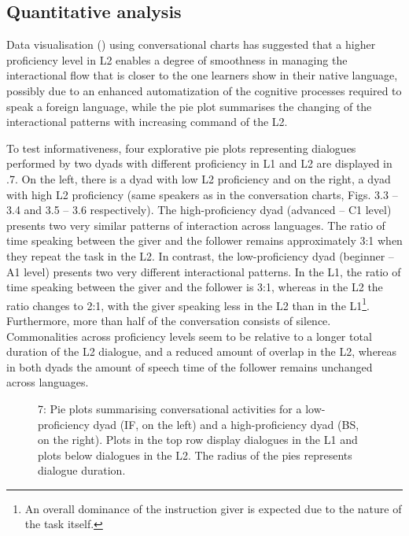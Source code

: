 \subsection{Quantitative analysis}
\hypertarget{Toc191305935}{}
Data visualisation () using conversational charts has suggested that a higher proficiency level in L2 enables a degree of smoothness in managing the interactional flow that is closer to the one learners show in their native language, possibly due to an enhanced automatization of the cognitive processes required to speak a foreign language, while the pie plot summarises the changing of the interactional patterns with increasing command of the L2. 

To test informativeness, four explorative pie plots representing dialogues performed by two dyads with different proficiency in L1 and L2 are displayed in .7. On the left, there is a dyad with low L2 proficiency and on the right, a dyad with high L2 proficiency (same speakers as in the conversation charts, Figs. 3.3 – 3.4 and 3.5 – 3.6 respectively). The high-proficiency dyad (advanced – C1 level) presents two very similar patterns of interaction across languages. The ratio of time speaking between the giver and the follower remains approximately 3:1 when they repeat the task in the L2. In contrast, the low-proficiency dyad (beginner – A1 level) presents two very different interactional patterns. In the L1, the ratio of time speaking between the giver and the follower is 3:1, whereas in the L2 the ratio changes to 2:1, with the giver speaking less in the L2 than in the L1\footnote{An overall dominance of the instruction giver is expected due to the nature of the task itself.}. Furthermore, more than half of the conversation consists of silence. Commonalities across proficiency levels seem to be relative to a longer total duration of the L2 dialogue, and a reduced amount of overlap in the L2, whereas in both dyads the amount of speech time of the follower remains unchanged across languages.

  
 

\begin{stylecaption}\begin{figure}
\caption{7: Pie plots summarising conversational activities for a low-proficiency dyad (IF, on the left) and a high-proficiency dyad (BS, on the right). Plots in the top row display dialogues in the L1 and plots below dialogues in the L2. The radius of the pies represents dialogue duration.}
\label{fig:key:3}
\end{figure}\end{stylecaption}

